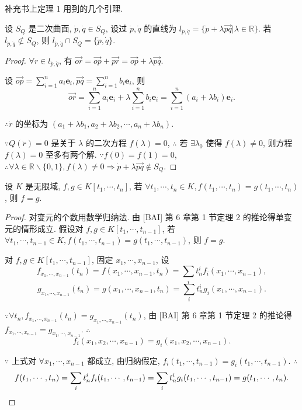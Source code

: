 \documentclass{ctexart}
\begin{document}
补充书上定理 1 用到的几个引理.
\begin{lemma}
    设 $S_Q$ 是二次曲面, $\dot{p},\dot{q}\in S_Q$, 设过 $\dot{p},\dot{q}$ 的直线为 $l_{\dot{p},\dot{q}}=\{\dot{p}+\lambda\overrightarrow{pq}|\lambda\in\mathbb{R}\}$. 若 $l_{\dot{p},\dot{q}}\not\subset S_Q$, 则 $l_{\dot{p},\dot{q}}\cap S_Q=\{\dot{p},\dot{q}\}$.
\end{lemma}
\begin{proof}
    $\forall\dot{r}\in l_{\dot{p},\dot{q}}$, 有 $\overrightarrow{or}=\overrightarrow{op}+\overrightarrow{pr}=\overrightarrow{op}+\lambda\overrightarrow{pq}$.

    设 $\overrightarrow{op}=\sum\limits_{i=1}^na_i\boldsymbol{e}_i,\overrightarrow{pq}=\sum\limits_{i=1}^nb_i\boldsymbol{e}_i$, 则
    \[\overrightarrow{or}=\sum\limits_{i=1}^na_i\boldsymbol{e}_i+\lambda\sum\limits_{i=1}^nb_i\boldsymbol{e}_i=\sum\limits_{i=1}^n(a_i+\lambda b_i)\boldsymbol{e}_i.\]

    $\therefore\dot{r}$ 的坐标为 $(a_1+\lambda b_1,a_2+\lambda b_2,\cdots,a_n+\lambda b_n)$.

    $\because Q(\dot{r})=0$ 是关于 $\lambda$ 的二次方程 $f(\lambda)=0$, $\therefore$ 若 $\exists\lambda_0$ 使得 $f(\lambda)\neq0$, 则方程 $f(\lambda)=0$ 至多有两个解. $\because f(0)=f(1)=0$, $\therefore\forall\lambda\in\mathbb{R}\backslash\{0,1\},f(\lambda)\neq0\Rightarrow\dot{p}+\lambda\overrightarrow{pq}\notin S_Q$.
\end{proof}
\begin{lemma}\label{l2.2}
    设 $K$ 是无限域, $f,g\in K[t_1,\cdots,t_n]$, 若 $\forall t_1,\cdots,t_n\in K,f(t_1,\cdots,t_n)=g(t_1,\cdots,t_n)$, 则 $f=g$.
\end{lemma}
\begin{proof}
    对变元的个数用数学归纳法. 由 [BAI] 第 6 章第 1 节定理 2 的推论得单变元的情形成立. 假设对 $f,g\in K[t_1,\cdots,t_{n-1}]$, 若 $\forall t_1,\cdots,t_{n-1}\in K,f(t_1,\cdots,t_{n-1})=g(t_1,\cdots,t_{n-1})$, 则 $f=g$.

    对 $f,g\in K[t_1,\cdots,t_{n-1}]$, 固定 $x_1,\cdots,x_{n-1}$, 设
    \[f_{x_1,\cdots,x_{n-1}}(t_n)=f(x_1,\cdots,x_{n-1},t_n)=\sum\limits_it_n^if_i(x_1,\cdots,x_{n-1}),\]
    \[g_{x_1,\cdots,x_{n-1}}(t_n)=g(x_1,\cdots,x_{n-1},t_n)=\sum\limits_it_n^ig_i(x_1,\cdots,x_{n-1}).\]

    $\because\forall t_n,f_{x_1,\cdots,x_{n-1}}(t_n)=g_{x_1,\cdots,x_{n-1}}(t_n)$, 由 [BAI] 第 6 章第 1 节定理 2 的推论得 $f_{x_1,\cdots,x_{n-1}}=g_{x_1,\cdots,x_{n-1}}$. $\therefore$
    \[f_i(x_1,x_2,\cdots,x_{n-1})=g_i(x_1,x_2,\cdots,x_{n-1}).\]

    $\because$ 上式对 $\forall x_1,\cdots,x_{n-1}$ 都成立, 由归纳假定, $f_i(t_1,\cdots,t_{n-1})=g_i(t_1,\cdots,t_{n-1})$. $\therefore$
    \[f(t_1,\cdots,t_n)=\sum\limits_it_n^if_i(t_1,\cdots,t_{n-1})=\sum\limits_it_n^ig_i(t_1,\cdots,t_{n-1})=g(t_1,\cdots,t_n).\qedhere\]
\end{proof}
\end{document}

